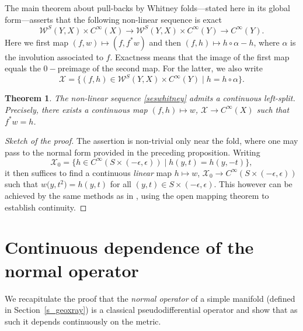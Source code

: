 \documentclass[pdftex]{sigma}
\numberwithin{equation}{section}
\newtheorem{Theorem}{Theorem}[section]
\theoremstyle{definition}
\newcommand{\1}{{\bf 1}}
\begin{document}
The main theorem about pull-backs by Whitney folds---stated here in its global form---asserts that the following non-linear sequence is exact
\begin{equation}\label{seswhitney}
	\mathcal W^S(Y,X)\times C^\infty(X)\to \mathcal W^S(Y,X)\times C^\infty(Y)\to C^\infty(Y).
\end{equation}
Here we first map $(f,w) \mapsto (f,f^*w)$ and then $(f,h)\mapsto h\circ \alpha- h$, where $\alpha$ is the involution associated to $f$. Exactness means that the image of the first map equals the $0-$preimage of the second map. For the latter, we also write
\[
	\mathcal X = \big\{(f,h)\in \mathcal W^S(Y,X)\times C^\infty(Y)\mid h = h\circ \alpha\big\}.
\]


\begin{Theorem}\label{thm_seswhitney} The non-linear sequence \eqref{seswhitney} admits a continuous left-split. Precisely, there exists a continuous map
$(f,h)\mapsto w$, $ \mathcal X \to C^\infty(X)$
such that $f^*w = h$.
\end{Theorem}

\begin{proof}[Sketch of the proof]
	The assertion is non-trivial only near the fold, where one may pass to the normal form provided in the preceding proposition. Writing
	\[
		\mathcal X_0 = \{h\in C^\infty\left(S\times (-\epsilon,\epsilon)\right)\mid h(y,t) = h(y,-t) \},
	\]
	it then suffices to find a continuous {\it linear} map $h\mapsto w $, $ \mathcal X_0 \to C^\infty(S\times (-\epsilon,\epsilon))$
	such that $w\bigl(y,t^2\bigr)=h(y,t)$ for all $(y,t)\in S\times (-\epsilon,\epsilon)$. This however can be achieved by the same methods as in \cite[Theorem C.4.4]{Hor07}, using the open mapping theorem to establish continuity.
\end{proof}


\section{Continuous dependence of the normal operator} \label{s_appb}

We recapitulate the proof that the {\it normal operator} of a simple manifold (defined in Section~\ref{s_geoxray}) is a classical pseudodifferential operator and show that as such it depends continuously on the metric.
\end{document}
